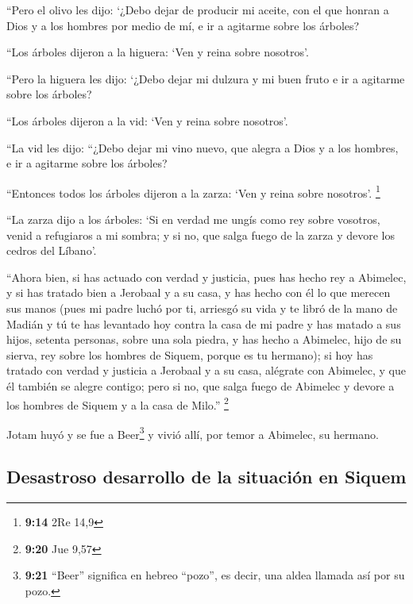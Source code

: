  ``Pero el olivo les dijo: `¿Debo dejar de producir mi
aceite, con el que honran a Dios y a los hombres por medio de mí, e ir a
agitarme sobre los árboles?

 ``Los árboles dijeron a la higuera: `Ven y reina sobre
nosotros'.

 ``Pero la higuera les dijo: `¿Debo dejar mi dulzura y mi
buen fruto e ir a agitarme sobre los árboles?

 ``Los árboles dijeron a la vid: `Ven y reina sobre
nosotros'.

 ``La vid les dijo: ``¿Debo dejar mi vino nuevo, que
alegra a Dios y a los hombres, e ir a agitarme sobre los árboles?

 ``Entonces todos los árboles dijeron a la zarza: `Ven y
reina sobre nosotros'. \footnote{\textbf{9:14} 2Re 14,9}

 ``La zarza dijo a los árboles: `Si en verdad me ungís
como rey sobre vosotros, venid a refugiaros a mi sombra; y si no, que
salga fuego de la zarza y devore los cedros del Líbano'.

 ``Ahora bien, si has actuado con verdad y justicia, pues
has hecho rey a Abimelec, y si has tratado bien a Jerobaal y a su casa,
y has hecho con él lo que merecen sus manos  (pues mi
padre luchó por ti, arriesgó su vida y te libró de la mano de Madián
 y tú te has levantado hoy contra la casa de mi padre y
has matado a sus hijos, setenta personas, sobre una sola piedra, y has
hecho a Abimelec, hijo de su sierva, rey sobre los hombres de Siquem,
porque es tu hermano);  si hoy has tratado con verdad y
justicia a Jerobaal y a su casa, alégrate con Abimelec, y que él también
se alegre contigo;  pero si no, que salga fuego de
Abimelec y devore a los hombres de Siquem y a la casa de Milo.''
\footnote{\textbf{9:20} Jue 9,57}

 Jotam huyó y se fue a Beer\footnote{\textbf{9:21}
  ``Beer'' significa en hebreo ``pozo'', es decir, una aldea llamada así
  por su pozo.} y vivió allí, por temor a Abimelec, su hermano.

\hypertarget{desastroso-desarrollo-de-la-situaciuxf3n-en-siquem}{%
\subsection{Desastroso desarrollo de la situación en
Siquem}\label{desastroso-desarrollo-de-la-situaciuxf3n-en-siquem}}

